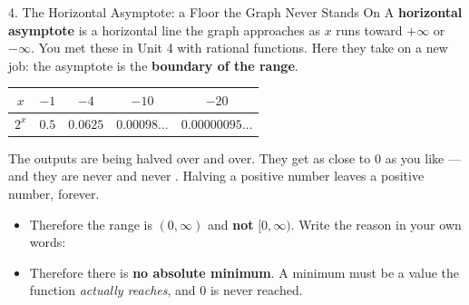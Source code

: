 \documentclass[10pt]{article}
\begin{document}
\begin{notesbox}{4. The Horizontal Asymptote: a Floor the Graph Never Stands On}
A \textbf{horizontal asymptote} is a horizontal line the graph approaches as $x$ runs toward
$+\infty$ or $-\infty$. You met these in Unit 4 with rational functions. Here they take on a new job:
the asymptote is the \textbf{boundary of the range}.
\begin{center}
\renewcommand{\arraystretch}{1.2}
\begin{tabular}{|c|c|c|c|c|}
\hline
$x$ & $-1$ & $-4$ & $-10$ & $-20$ \\ \hline
$2^{x}$ & $0.5$ & $0.0625$ & $0.00098\ldots$ & $0.00000095\ldots$ \\ \hline
\end{tabular}
\end{center}
The outputs are being halved over and over. They get as close to $0$ as you like --- and they are
never \blank{1.6cm} and never \blank{1.6cm}. Halving a positive number leaves a positive number,
forever.
\begin{itemize}[leftmargin=1.5em, itemsep=3pt]
  \item Therefore the range is $(0,\infty)$ and \textbf{not} $[0,\infty)$. Write the reason in your
        own words: \writeline
  \item Therefore there is \textbf{no absolute minimum}. A minimum must be a value the function
        \emph{actually reaches}, and $0$ is never reached.
\end{itemize}


\end{notesbox}
\end{document}
